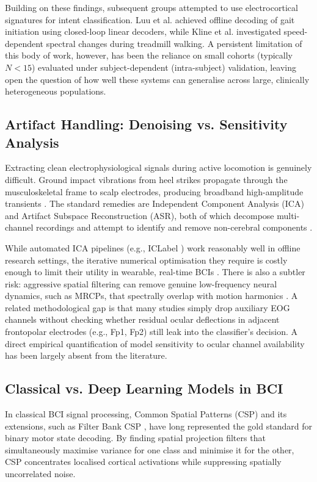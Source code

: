 \documentclass[11pt,a4paper]{article}
\begin{document}
Building on these findings, subsequent groups attempted to use electrocortical signatures for intent classification. Luu et al. \cite{luu2017gait} achieved offline decoding of gait initiation using closed-loop linear decoders, while Kline et al. \cite{kline2015locomotion} investigated speed-dependent spectral changes during treadmill walking. A persistent limitation of this body of work, however, has been the reliance on small cohorts (typically $N < 15$) evaluated under subject-dependent (intra-subject) validation, leaving open the question of how well these systems can generalise across large, clinically heterogeneous populations.

\subsection{Artifact Handling: Denoising vs. Sensitivity Analysis}
Extracting clean electrophysiological signals during active locomotion is genuinely difficult. Ground impact vibrations from heel strikes propagate through the musculoskeletal frame to scalp electrodes, producing broadband high-amplitude transients \cite{castermans2014accidental, snyder2015independent}. The standard remedies are Independent Component Analysis (ICA) and Artifact Subspace Reconstruction (ASR), both of which decompose multi-channel recordings and attempt to identify and remove non-cerebral components \cite{mullen2015realtime, chang2018evaluation}.

While automated ICA pipelines (e.g., ICLabel \cite{pion2019iclabel}) work reasonably well in offline research settings, the iterative numerical optimisation they require is costly enough to limit their utility in wearable, real-time BCIs \cite{uribe2021review}. There is also a subtler risk: aggressive spatial filtering can remove genuine low-frequency neural dynamics, such as MRCPs, that spectrally overlap with motion harmonics \cite{kline2015locomotion}. A related methodological gap is that many studies simply drop auxiliary EOG channels without checking whether residual ocular deflections in adjacent frontopolar electrodes (e.g., Fp1, Fp2) still leak into the classifier's decision. A direct empirical quantification of model sensitivity to ocular channel availability has been largely absent from the literature.

\subsection{Classical vs. Deep Learning Models in BCI}
In classical BCI signal processing, Common Spatial Patterns (CSP) \cite{ramoser2000optimal, blankertz2008optimizing} and its extensions, such as Filter Bank CSP \cite{ang2012filter}, have long represented the gold standard for binary motor state decoding. By finding spatial projection filters that simultaneously maximise variance for one class and minimise it for the other, CSP concentrates localised cortical activations while suppressing spatially uncorrelated noise.
\end{document}

